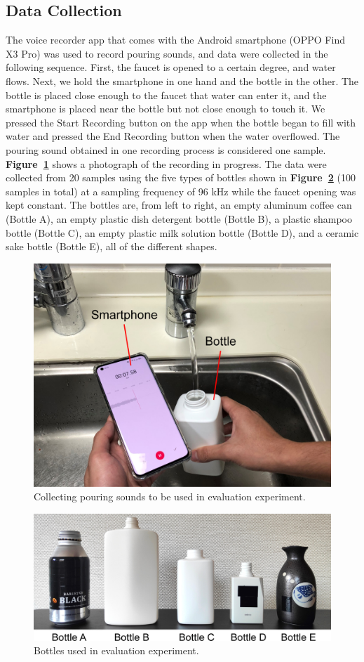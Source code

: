 \documentclass[sigconf,authordraft]{acmart}
\newcommand\figref[1]{\textbf{Figure~\ref{fig:#1}}}
\begin{document}
\subsection{Data Collection}
The voice recorder app that comes with the Android smartphone (OPPO Find X3 Pro) was used to record pouring sounds, and data were collected in the following sequence. First, the faucet is opened to a certain degree, and water flows. Next, we hold the smartphone in one hand and the bottle in the other. The bottle is placed close enough to the faucet that water can enter it, and the smartphone is placed near the bottle but not close enough to touch it. We pressed the Start Recording button on the app when the bottle began to fill with water and pressed the End Recording button when the water overflowed. The pouring sound obtained in one recording process is considered one sample. \figref{data_acquisition} shows a photograph of the recording in progress. The data were collected from 20 samples using the five types of bottles shown in \figref{bottles} (100 samples in total) at a sampling frequency of 96 kHz while the faucet opening was kept constant. The bottles are, from left to right, an empty aluminum coffee can (Bottle A), an empty plastic dish detergent bottle (Bottle B), a plastic shampoo bottle (Bottle C), an empty plastic milk solution bottle (Bottle D), and a ceramic sake bottle (Bottle E), all of the different shapes.

\begin{figure}[!t]
  \centering
  \includegraphics[width=0.5\linewidth]{figures/data_acquisition.eps}
  \caption{Collecting pouring sounds to be used in evaluation experiment.}
  \label{fig:data_acquisition}
\end{figure}

\begin{figure}[!t]
  \centering
  \includegraphics[width=0.5\linewidth]{figures/bottles.eps}
  \caption{Bottles used in evaluation experiment.}
  \label{fig:bottles}
\end{figure}
\end{document}
